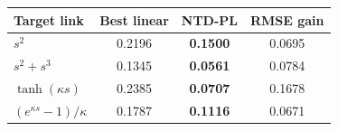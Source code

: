 \begin{tabular}{@{}lccc@{}}
\toprule
Target link & Best linear & NTD-PL & RMSE gain \\
\midrule
\(s^2\) & 0.2196 & \textbf{0.1500} & 0.0695 \\
\(s^2+s^3\) & 0.1345 & \textbf{0.0561} & 0.0784 \\
\(\tanh(\kappa s)\) & 0.2385 & \textbf{0.0707} & 0.1678 \\
\((e^{\kappa s}-1)/\kappa\) & 0.1787 & \textbf{0.1116} & 0.0671 \\
\bottomrule
\end{tabular}
